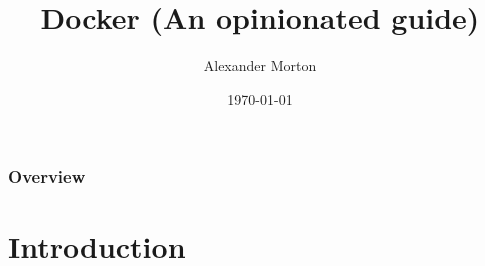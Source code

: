 \documentclass{beamer}
\title[Docker (An opinionated guide)]{Docker (An opinionated guide)} %
\author{Alexander Morton} %
\institute[Financial Cloud] %
{
Financial Cloud\\ %
\medskip
\textit{alex.morton@financial-cloud.com} %
}
\date{\today} %
\begin{document}
\begin{frame}
\titlepage %
\end{frame}

\begin{frame}
\frametitle{Overview} %
\tableofcontents %
\end{frame}


\section{Introduction} %
\end{document}
